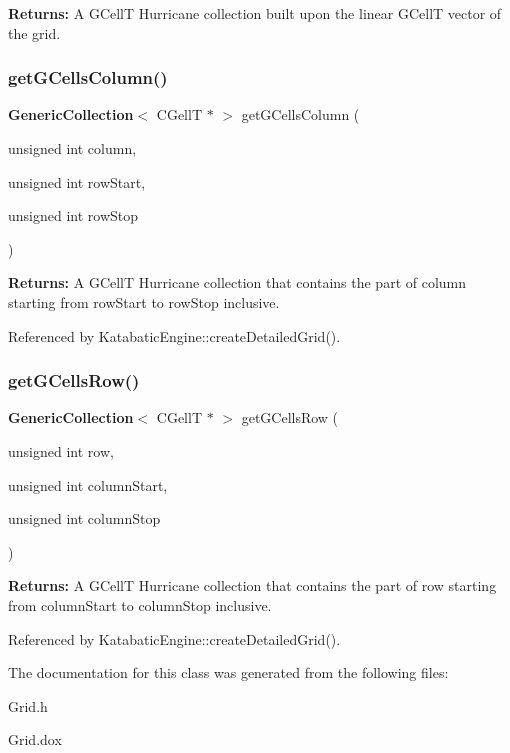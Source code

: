 {\bfseries Returns\+:} A G\+CellT Hurricane collection built upon the linear G\+CellT vector of the grid. \mbox{\label{classKatabatic_1_1Grid_aa8d0393323104d48c089a8429b254689}} 
\subsubsection{\texorpdfstring{get\+G\+Cells\+Column()}{getGCellsColumn()}}
{\footnotesize\ttfamily \textbf{ Generic\+Collection}$<$ C\+GellT $\ast$ $>$ get\+G\+Cells\+Column (\begin{DoxyParamCaption}\item[{unsigned int}]{column,  }\item[{unsigned int}]{row\+Start,  }\item[{unsigned int}]{row\+Stop }\end{DoxyParamCaption})\hspace{0.3cm}{\ttfamily [inline]}}

{\bfseries Returns\+:} A G\+CellT Hurricane collection that contains the part of {\ttfamily column} starting from {\ttfamily row\+Start} to {\ttfamily row\+Stop} inclusive. 

Referenced by Katabatic\+Engine\+::create\+Detailed\+Grid().

\mbox{\label{classKatabatic_1_1Grid_a35e2075302cdb696945f05c5bcc817a0}} 
\subsubsection{\texorpdfstring{get\+G\+Cells\+Row()}{getGCellsRow()}}
{\footnotesize\ttfamily \textbf{ Generic\+Collection}$<$ C\+GellT $\ast$ $>$ get\+G\+Cells\+Row (\begin{DoxyParamCaption}\item[{unsigned int}]{row,  }\item[{unsigned int}]{column\+Start,  }\item[{unsigned int}]{column\+Stop }\end{DoxyParamCaption})\hspace{0.3cm}{\ttfamily [inline]}}

{\bfseries Returns\+:} A G\+CellT Hurricane collection that contains the part of {\ttfamily row} starting from {\ttfamily column\+Start} to {\ttfamily column\+Stop} inclusive. 

Referenced by Katabatic\+Engine\+::create\+Detailed\+Grid().



The documentation for this class was generated from the following files\+:\begin{DoxyCompactItemize}
\item 
Grid.\+h\item 
Grid.\+dox\end{DoxyCompactItemize}
